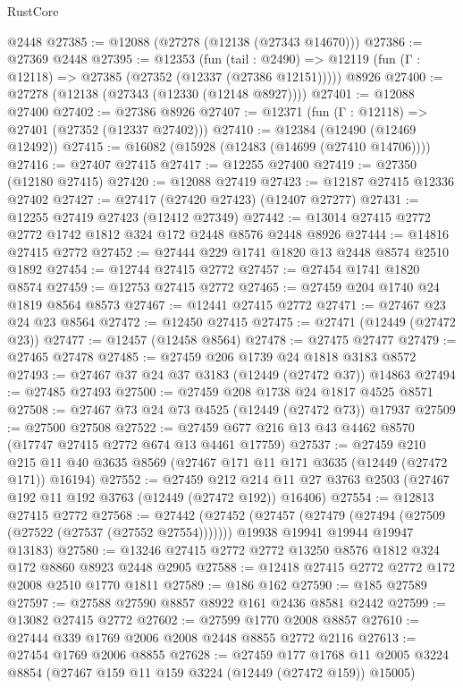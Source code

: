 \begin{lexlean}{RustCore}
\begin{coremodule}
    @2448
@27385 := @12088 (@27278 (@12138 (@27343 @14670)))
@27386 := @27369 @2448
@27395 := @12353
    (fun (tail : @2490) => @12119 (fun (Γ : @12118) => @27385 (@27352 (@12337 (@27386 @12151)))))
    @8926
@27400 := @27278 (@12138 (@27343 (@12330 (@12148 @8927))))
@27401 := @12088 @27400
@27402 := @27386 @8926
@27407 := @12371 (fun (Γ : @12118) => @27401 (@27352 (@12337 @27402)))
@27410 := @12384 (@12490 (@12469 @12492))
@27415 := @16082 (@15928 (@12483 (@14699 (@27410 @14706))))
@27416 := @27407 @27415
@27417 := @12255 @27400
@27419 := @27350 (@12180 @27415)
@27420 := @12088 @27419
@27423 := @12187 @27415 @12336 @27402
@27427 := @27417 (@27420 @27423) (@12407 @27277)
@27431 := @12255 @27419 @27423 (@12412 @27349)
@27442 := @13014 @27415 @2772 @2772 @1742 @1812 @324 @172 @2448 @8576 @2448 @8926
@27444 := @14816 @27415 @2772
@27452 := @27444 @229 @1741 @1820 @13 @2448 @8574 @2510 @1892
@27454 := @12744 @27415 @2772
@27457 := @27454 @1741 @1820 @8574
@27459 := @12753 @27415 @2772
@27465 := @27459 @204 @1740 @24 @1819 @8564 @8573
@27467 := @12441 @27415 @2772
@27471 := @27467 @23 @24 @23 @8564
@27472 := @12450 @27415
@27475 := @27471 (@12449 (@27472 @23))
@27477 := @12457 (@12458 @8564)
@27478 := @27475 @27477
@27479 := @27465 @27478
@27485 := @27459 @206 @1739 @24 @1818 @3183 @8572
@27493 := @27467 @37 @24 @37 @3183 (@12449 (@27472 @37)) @14863
@27494 := @27485 @27493
@27500 := @27459 @208 @1738 @24 @1817 @4525 @8571
@27508 := @27467 @73 @24 @73 @4525 (@12449 (@27472 @73)) @17937
@27509 := @27500 @27508
@27522 := @27459 @677 @216 @13 @43 @4462 @8570 (@17747 @27415 @2772 @674 @13 @4461 @17759)
@27537 := @27459
    @210
    @215
    @11
    @40
    @3635
    @8569
    (@27467 @171 @11 @171 @3635 (@12449 (@27472 @171)) @16194)
@27552 := @27459
    @212
    @214
    @11
    @27
    @3763
    @2503
    (@27467 @192 @11 @192 @3763 (@12449 (@27472 @192)) @16406)
@27554 := @12813 @27415 @2772
@27568 := @27442
    (@27452
      (@27457 (@27479 (@27494 (@27509 (@27522 (@27537 (@27552 @27554)))))))
      @19938
      @19941
      @19944
      @19947
      @13183)
@27580 := @13246 @27415 @2772 @2772 @13250 @8576 @1812 @324 @172 @8860 @8923 @2448 @2905
@27588 := @12418 @27415 @2772 @2772 @172 @2008 @2510 @1770 @1811
@27589 := @186 @162
@27590 := @185 @27589
@27597 := @27588 @27590 @8857 @8922 @161 @2436 @8581 @2442
@27599 := @13082 @27415 @2772
@27602 := @27599 @1770 @2008 @8857
@27610 := @27444 @339 @1769 @2006 @2008 @2448 @8855 @2772 @2116
@27613 := @27454 @1769 @2006 @8855
@27628 := @27459
    @177
    @1768
    @11
    @2005
    @3224
    @8854
    (@27467 @159 @11 @159 @3224 (@12449 (@27472 @159)) @15005)

\end{coremodule}
\end{lexlean}
